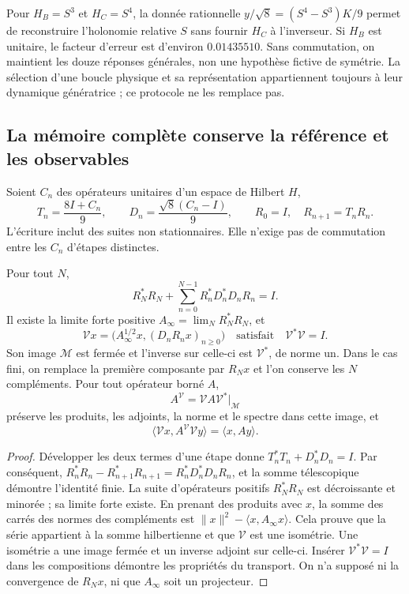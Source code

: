 Pour \(H_B=S^3\) et \(H_C=S^4\), la donnée rationnelle
\(y/\sqrt8=(S^4-S^3)K/9\) permet de reconstruire l’holonomie relative
\(S\) sans fournir \(H_C\) à l’inverseur. Si \(H_B\) est
unitaire, le facteur d’erreur est d’environ \(0.01435510\). Sans
commutation, on maintient les douze réponses générales, non une hypothèse
fictive de symétrie. La sélection d’une boucle physique et sa représentation
appartiennent toujours à leur dynamique génératrice ; ce protocole ne les
remplace pas.

\subsection{La mémoire complète conserve la référence et les observables}
\label{lib01:memoria-completa}

Soient \(C_n\) des opérateurs unitaires d'un espace de Hilbert \(H\),
\[
 T_n=\frac{8I+C_n}{9},\qquad
 D_n=\frac{\sqrt8(C_n-I)}9,\qquad
 R_0=I,\quad R_{n+1}=T_nR_n.
\]
L'écriture inclut des suites non stationnaires. Elle n'exige pas de commutation entre les \(C_n\) d'étapes distinctes.

\begin{theorem}
\label{lib01:isometria}
Pour tout \(N\),
\[
 R_N^*R_N+\sum_{n=0}^{N-1}R_n^*D_n^*D_nR_n=I.
\]
Il existe la limite forte positive \(A_\infty=\lim_N R_N^*R_N\), et
\begin{equation}
 \mathcal Vx=
 \bigl(A_\infty^{1/2}x,(D_nR_nx)_{n\geq0}\bigr)
 \quad\text{satisfait}\quad\mathcal V^*\mathcal V=I.
 \label{lib01:V-infinita}
\end{equation}
Son image \(\mathcal M\) est fermée et l'inverse sur celle-ci est \(\mathcal V^*\), de norme un. Dans le cas fini, on remplace la première composante par \(R_Nx\) et l'on conserve les \(N\) compléments. Pour tout opérateur borné \(A\),
\[
 A^{\mathcal V}=\mathcal VA\mathcal V^*\big|_{\mathcal M}
\]
préserve les produits, les adjoints, la norme et le spectre dans cette image, et
\[
 \langle\mathcal Vx,A^{\mathcal V}\mathcal Vy\rangle
 =\langle x,Ay\rangle.
\]
\end{theorem}
\begin{proof}
Développer les deux termes d’une étape donne
\(T_n^*T_n+D_n^*D_n=I\). Par conséquent,
\(R_n^*R_n-R_{n+1}^*R_{n+1}=R_n^*D_n^*D_nR_n\), et la somme
télescopique démontre l’identité finie. La suite d’opérateurs
positifs \(R_N^*R_N\) est décroissante et minorée ; sa
limite forte existe. En prenant des produits avec \(x\), la somme des
carrés des normes des compléments est
\(\|x\|^2-\langle x,A_\infty x\rangle\). Cela prouve que la
série appartient à la somme hilbertienne et que \(\mathcal V\) est une
isométrie. Une isométrie a une image fermée et un inverse adjoint sur celle-ci.
Insérer \(\mathcal V^*\mathcal V=I\) dans les compositions démontre
les propriétés du transport. On n’a supposé ni la convergence de
\(R_Nx\), ni que \(A_\infty\) soit un projecteur.
\end{proof}

